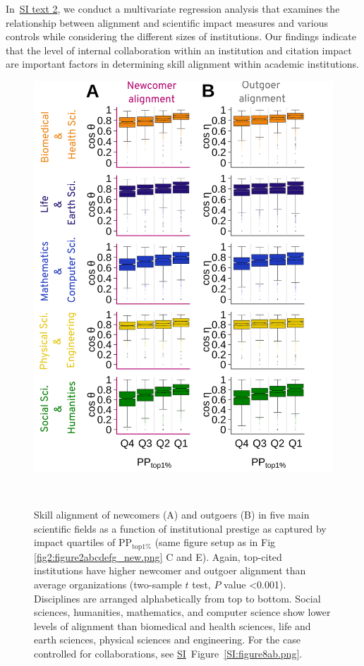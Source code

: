 \documentclass[draft,final]{vutinfth} %
\begin{document}
In~\hyperref[SI4]{SI text 2}, we conduct a multivariate regression analysis that examines the relationship between alignment and scientific impact measures and various controls while considering the different sizes of institutions. Our findings indicate that the level of internal collaboration within an institution and citation impact are important factors in determining skill alignment within academic institutions. 

\begin{figure}[!ht] %
\centering
\includegraphics[width=0.7\linewidth]{figures_alignment/figure4ab.png}
\caption{Skill alignment of newcomers (A) and outgoers (B) 
in five main scientific fields as  a function of  institutional prestige as captured by impact quartiles of PP$_\mathrm{top1\%}$ (same figure setup as in Fig \ref{fig2:figure2abcdefg_new.png} C and E). Again, top-cited institutions have higher newcomer and outgoer alignment than average organizations (two-sample $t$ test, $P$ value <0.001). Disciplines are arranged alphabetically from top to bottom.
Social sciences, humanities, mathematics, and computer science show lower levels of alignment than biomedical and health sciences, life and earth sciences, physical sciences and engineering.
For the case controlled for collaborations, see  \hyperref[SI]{SI}~Figure~\ref{SI:figure8ab.png}.}
~\label{fig4:figure4ab.png}
\end{figure}
\end{document}
